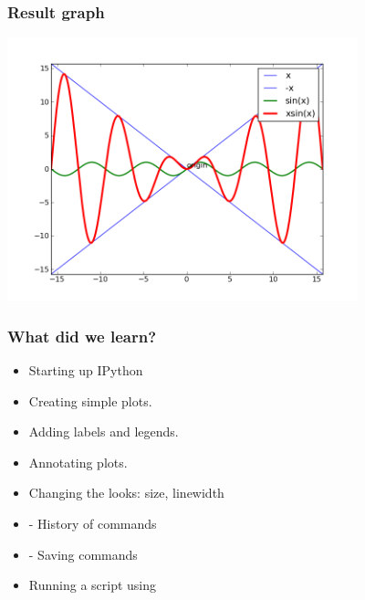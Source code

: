 \documentclass[14pt,compress]{beamer}
\newcommand{\kwrd}[1]{ \texttt{\textbf{\color{blue}{#1}}}  }
\begin{document}
\begin{frame}[fragile]
  \frametitle{Result graph}
  \begin{center}
    \includegraphics[height=3in, interpolate=true]{data/four_plot}
  \end{center}
\end{frame}

\begin{frame}[fragile]
  \frametitle{What did we learn?}
  \begin{itemize}
    \item Starting up IPython
    \item Creating simple plots.
    \item Adding labels and legends.
    \item Annotating plots.
    \item Changing the looks: size, linewidth
    \item \kwrd{\%hist} - History of commands
    \item \kwrd{\%save} - Saving commands 
    \item Running a script using \kwrd{\%run -i}
  \end{itemize}
\end{frame}
\end{document}
